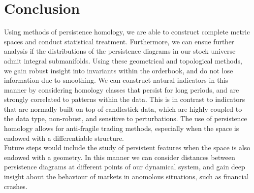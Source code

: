\documentclass[14pt]{extarticle}
\begin{document}
\part{Conclusion}

Using methods of persistence homology, we are able to construct complete metric spaces and conduct statistical treatment. Furthermore, we can ensue further analysis if the distributions of the persistence diagrams in our stock universe admit integral submanifolds. Using these geometrical and topological methods, we gain robust insight into invariants within the orderbook, and do not lose information due to smoothing. We can construct natural indicators in this manner by considering homology classes that persist for long periods, and are strongly correlated to patterns within the data. This is in contrast to indicators that are normally built on top of candlestick data, which are highly coupled to the data type, non-robust, and sensitive to perturbations. The use of persistence homology allows for anti-fragile trading methods, especially when the space is endowed with a differentiable structure.\\
Future steps would include the study of persistent features when the space is also endowed with a geometry. In this manner we can consider distances between persistence diagrams at different points of our dynamical system, and gain deep insight about the behaviour of markets in anomolous situations, such as financial crashes.

\nocite{*}

\end{document}

